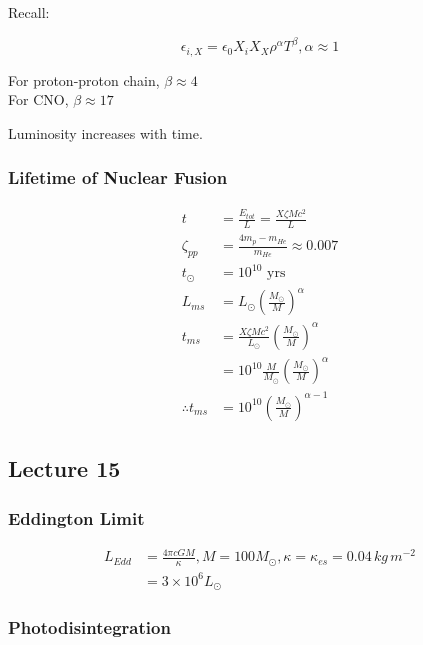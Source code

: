 \documentclass[a4paper,11pt,normalem]{article}
\begin{document}
Recall:

\[
    \epsilon_{i,X} = \epsilon_0 X_i X_X \rho^\alpha T^\beta, \alpha \approx 1
\]

For proton-proton chain, \(\beta \approx 4\)\\
For CNO, \(\beta \approx 17\)

Luminosity increases with time.

\subsubsection{Lifetime of Nuclear
Fusion}\label{lifetime-of-nuclear-fusion}

\[
    \begin{aligned}
    t &= \frac{E_{tot}}{L} = \frac{X\zeta Mc^2}{L} \\
    \zeta_{pp} &= \frac{4m_p - m_{He}}{m_{He}} \approx 0.007 \\
    t_{\odot} &= 10^{10} \text{ yrs} \\
    L_{ms} &= L_\odot \left(\frac{M_\odot}{M}\right)^{\alpha} \\
    t_{ms} &= \frac{X\zeta Mc^2}{L_\odot}\left(\frac{M_\odot}{M}\right)^{\alpha} \\
    &= 10^{10}\frac{M}{M_\odot}\left(\frac{M_\odot}{M}\right)^{\alpha} \\
    \therefore t_{ms} &= 10^{10}\left(\frac{M_\odot}{M}\right)^{\alpha - 1}
    \end{aligned}
\]

\subsection{Lecture 15}\label{lecture-15}

\subsubsection{Eddington Limit}\label{eddington-limit}

\[
    \begin{aligned}
    L_{Edd} &= \frac{4\pi cGM}{\kappa}, M = 100M_\odot, \kappa = \kappa_{es} = 0.04\,kg\,m^{-2} \\
    &= 3\times10^6 L_{\odot}
    \end{aligned}
\]

\subsubsection{Photodisintegration}\label{photodisintegration}
\end{document}
